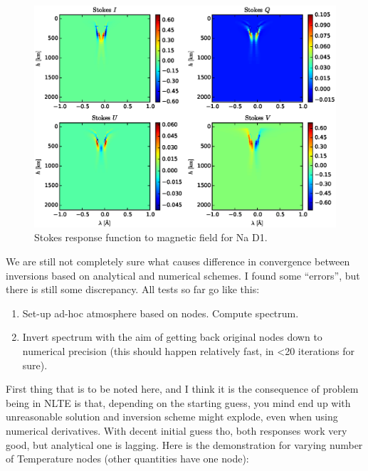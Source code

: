 \documentclass[a4paper,10pt]{article}
\begin{document}
\begin{figure}
 \includegraphics[width=\textwidth]{Na_stokes_analytical_responses_intensity_B.eps}
 \caption{Stokes response function to magnetic field for Na D1.}
 \end{figure}
 
We are still not completely sure what causes difference in convergence between inversions based on analytical and numerical schemes. I found some ``errors'', but there is still some discrepancy. All tests so far go like this: 
\begin{enumerate}
 \item Set-up ad-hoc atmosphere based on nodes. Compute spectrum.
 \item Invert spectrum with the aim of getting back original nodes down to numerical precision (this should happen relatively fast, in <20 iterations for sure). 
\end{enumerate}
First thing that is to be noted here, and I think it is the consequence of problem being in NLTE is that, depending on the starting guess, you mind end up with unreasonable solution and inversion scheme might explode, even when using numerical derivatives. With decent initial guess tho, both responses work very good, but analytical one is lagging. Here is the demonstration for varying number of Temperature nodes (other quantities have one node):
\end{document}
